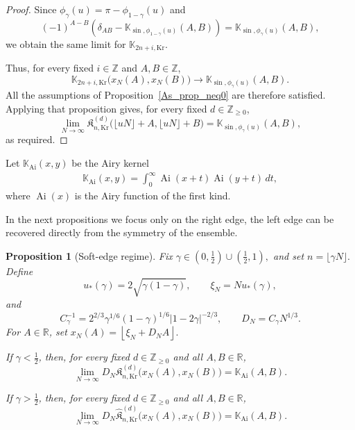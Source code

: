 \documentclass[reqno,11pt]{amsart}
\newcommand{\Khat}{\widehat{\mathfrak{K}}}
\newcommand{\ZZ}{\mathbb{Z}}
\newcommand{\RR}{\mathbb{R}}
\theoremstyle{plain}
\newtheorem{prop}[thm]{Proposition}
\theoremstyle{definition}
\numberwithin{equation}{section}
\begin{document}
\begin{proof}
Since $\phi_\gamma(u)=\pi-\phi_{1-\gamma}(u)$ and
\[
(-1)^{A-B}
\left(
\delta_{AB} -
\mathbb K_{\sin,\phi_{1-\gamma}(u)}(A,B)
\right) =
\mathbb K_{\sin,\phi_\gamma(u)}(A,B),
\]
we obtain the same limit for
\(\mathbb K_{2n+i,\mathrm{Kr}}\).

Thus, for every fixed \(i\in\ZZ\) and \(A,B\in\ZZ\),
\[
\mathbb K_{2n+i,\mathrm{Kr}}
\bigl(x_N(A),x_N(B)\bigr)
\longrightarrow
\mathbb K_{\sin,\phi_\gamma(u)}(A,B).
\]
All the assumptions of Proposition~\ref{As_prop_neq0} are therefore
satisfied. Applying that proposition gives, for every fixed
\(d\in\ZZ_{\geq0}\),
\[
\lim_{N\to\infty}
\mathfrak K_{n,\mathrm{Kr}}^{(d)}
\bigl(\lfloor uN\rfloor+A,\lfloor uN\rfloor+B\bigr)
=
\mathbb K_{\sin,\phi_\gamma(u)}(A,B),
\]
as required.
\end{proof}

Let $\mathbb{K}_{\mathrm{Ai}}(x,y)$  be the Airy kernel
\begin{align*}
\mathbb{K}_{\mathrm{Ai}}(x,y)=\int_{0}^{\infty}\operatorname{Ai}(x+t)\operatorname{Ai}(y+t)\,dt,
\end{align*}
where $\operatorname{Ai}(x)$ is the Airy function of the first kind.

In the next propositions we focus only on the right edge, the left edge can be recovered directly from the symmetry of the ensemble.
\begin{prop}[Soft-edge regime]\label{prop:Airy_Kr}
Fix
$
\gamma\in
\left(0,\frac12\right)\cup
\left(\frac12,1\right),
$
and set
$
n=\lfloor\gamma N\rfloor.
$
Define
\[
u_\ast(\gamma)=2\sqrt{\gamma(1-\gamma)},
\qquad
\xi_N=Nu_\ast(\gamma),
\]
and
\[
C_\gamma^{-1}
=
2^{2/3}
\gamma^{1/6}(1-\gamma)^{1/6}
|1-2\gamma|^{-2/3},
\qquad
D_N=C_\gamma N^{1/3}.
\]
For \(A\in\RR\), set
$
x_N(A)
=
\left\lfloor
\xi_N+D_NA
\right\rfloor.
$

If \(\gamma<\frac12\), then, for every fixed
\(d\in\ZZ_{\geq0}\) and all \(A,B\in\RR\),
\[
\lim_{N\to\infty}
D_N
\mathfrak K^{(d)}_{n,\mathrm{Kr}}
\bigl(x_N(A),x_N(B)\bigr)
=
\mathbb K_{\mathrm{Ai}}(A,B).
\]

If \(\gamma>\frac12\), then, for every fixed
\(d\in\ZZ_{\geq0}\) and all \(A,B\in\RR\),
\[
\lim_{N\to\infty}
D_N
\Khat^{(d)}_{n,\mathrm{Kr}}
\bigl(x_N(A),x_N(B)\bigr)
=
\mathbb K_{\mathrm{Ai}}(A,B).
\]
\end{prop}
\end{document}
